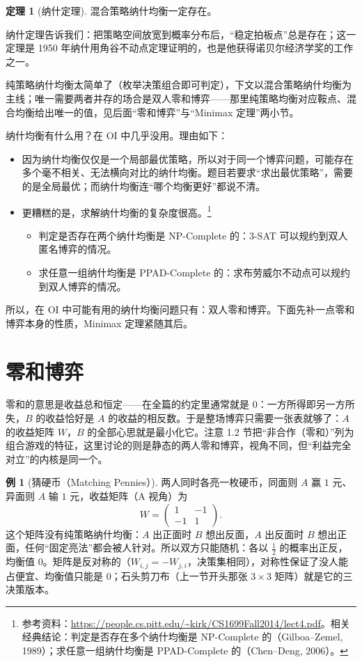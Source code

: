 \documentclass[UTF8,a4paper,11pt,oneside,openany,fontset=fandol]{ctexbook}
\theoremstyle{definition}
\newtheorem{theorem}[definition]{定理}
\newtheorem{example}[definition]{例}
\begin{document}
\begin{theorem}[纳什定理]\label{thm:nash}
混合策略纳什均衡一定存在。
\end{theorem}

纳什定理告诉我们：把策略空间放宽到概率分布后，“稳定拍板点”总是存在；这一定理是 1950 年纳什用角谷不动点定理证明的，也是他获得诺贝尔经济学奖的工作之一。

纯策略纳什均衡太简单了（枚举决策组合即可判定），下文以混合策略纳什均衡为主线；唯一需要两者并存的场合是双人零和博弈——那里纯策略均衡对应鞍点、混合均衡给出唯一的值，见后面“零和博弈”与“Minimax 定理”两小节。

纳什均衡有什么用？在 OI 中几乎没用。理由如下：
\begin{itemize}
\item 因为纳什均衡仅仅是一个局部最优策略，所以对于同一个博弈问题，可能存在多个毫不相关、无法横向对比的纳什均衡。题目若要求“求出最优策略”，需要的是全局最优；而纳什均衡连“哪个均衡更好”都说不清。
\item 更糟糕的是，求解纳什均衡的复杂度很高。\footnote{参考资料：\url{https://people.cs.pitt.edu/~kirk/CS1699Fall2014/lect4.pdf}。相关经典结论：判定是否存在多个纳什均衡是 NP-Complete 的（Gilboa--Zemel, 1989）；求任意一组纳什均衡是 PPAD-Complete 的（Chen--Deng, 2006）。}
\begin{itemize}
\item 判定是否存在两个纳什均衡是 NP-Complete 的：3-SAT 可以规约到双人匿名博弈的情况。
\item 求任意一组纳什均衡是 PPAD-Complete 的：求布劳威尔不动点可以规约到双人博弈的情况。
\end{itemize}
\end{itemize}
所以，在 OI 中可能有用的纳什均衡问题只有：双人零和博弈。下面先补一点零和博弈本身的性质，Minimax 定理紧随其后。

\section{零和博弈}
零和的意思是收益总和恒定——在全篇的约定里通常就是 $0$：一方所得即另一方所失，$B$ 的收益恰好是 $A$ 的收益的相反数。于是整场博弈只需要一张表就够了：$A$ 的收益矩阵 $W$，$B$ 的全部心思就是最小化它。注意 1.2 节把“非合作（零和）”列为组合游戏的特征，这里讨论的则是静态的两人零和博弈，视角不同，但“利益完全对立”的内核是同一个。

\begin{example}[猜硬币（Matching Pennies）]\label{ex:pennies}
两人同时各亮一枚硬币，同面则 $A$ 赢 $1$ 元、异面则 $A$ 输 $1$ 元，收益矩阵（A 视角）为
\[
 W=\begin{pmatrix}1&-1\\-1&1\end{pmatrix}.
\]
这个矩阵没有纯策略纳什均衡：$A$ 出正面时 $B$ 想出反面，$A$ 出反面时 $B$ 想出正面，任何“固定亮法”都会被人针对。所以双方只能随机：各以 $\tfrac12$ 的概率出正反，均衡值 $0$。矩阵是反对称的（$W_{i,j}=-W_{j,i}$，决策集相同），对称性保证了没人能占便宜、均衡值只能是 $0$；石头剪刀布（上一节开头那张 $3\times3$ 矩阵）就是它的三决策版本。
\end{example}
\end{document}
